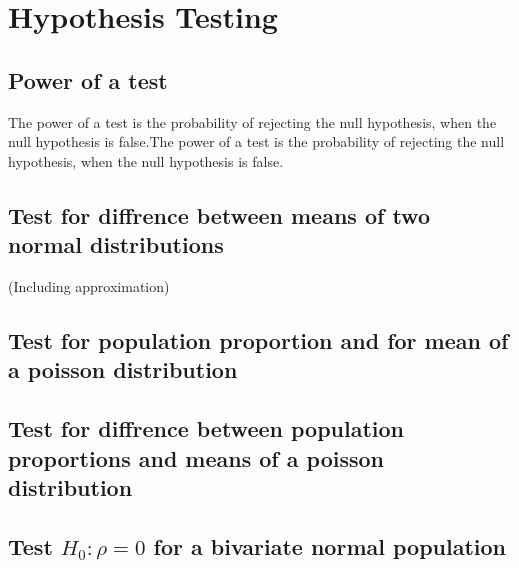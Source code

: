     \section{Hypothesis Testing}
        \subsection{Power of a test}
            The power of a test is the probability of rejecting the null hypothesis, when the null hypothesis is false.The power of a test is the probability of rejecting the null hypothesis, when the null hypothesis is false.

        \subsection{Test for diffrence between means of two normal distributions}
            (Including approximation)
        \subsection{Test for population proportion and for mean of a poisson distribution}
        \subsection{Test for diffrence between population proportions and means of a poisson distribution}
        \subsection{Test $H_0: \rho = 0$ for a bivariate normal population}
